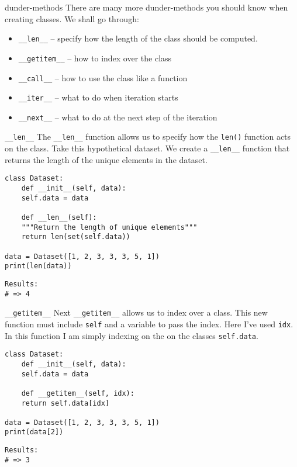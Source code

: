 \documentclass[10pt]{beamer}
\begin{document}
\begin{frame}[label={sec:org983105c},fragile]{dunder-methods}
 There are many more dunder-methods you should know when creating classes. We shall go through:

\begin{itemize}
\item \texttt{\_\_len\_\_} -- specify how the length of the class should be computed.
\item \texttt{\_\_getitem\_\_} -- how to index over the class
\item \texttt{\_\_call\_\_} -- how to use the class like a function
\item \texttt{\_\_iter\_\_} -- what to do when iteration starts
\item \texttt{\_\_next\_\_} -- what to do at the next step of the iteration
\end{itemize}
\end{frame}

\begin{frame}[label={sec:org6b76a12},fragile]{\texttt{\_\_len\_\_}}
 The \texttt{\_\_len\_\_} function allows us to specify how the \texttt{len()} function acts on the
class. Take this hypothetical dataset. We create a \texttt{\_\_len\_\_} function that returns the
length of the unique elements in the dataset.

\begin{verbatim}
class Dataset:
    def __init__(self, data):
	self.data = data

    def __len__(self):
	"""Return the length of unique elements"""
	return len(set(self.data))

data = Dataset([1, 2, 3, 3, 3, 5, 1])
print(len(data))
\end{verbatim}

\begin{verbatim}
Results: 
# => 4
\end{verbatim}
\end{frame}

\begin{frame}[label={sec:org4f41238},fragile]{\texttt{\_\_getitem\_\_}}
 Next \texttt{\_\_getitem\_\_} allows us to index over a class. This new function must include \texttt{self}
and a variable to pass the index. Here I've used \texttt{idx}. In this function I am simply
indexing on the on the classes \texttt{self.data}.

\begin{verbatim}
class Dataset:
    def __init__(self, data):
	self.data = data

    def __getitem__(self, idx):
	return self.data[idx]

data = Dataset([1, 2, 3, 3, 3, 5, 1])
print(data[2])
\end{verbatim}

\begin{verbatim}
Results: 
# => 3
\end{verbatim}
\end{frame}
\end{document}
